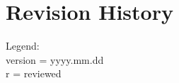
\begingroup
\let\cleardoublepage\relax
\let\clearpage\relax

\chapter*{Revision History}



\endgroup

{\vspace{-.5cm}
\footnotesize Legend: \\
version = yyyy.mm.dd \\
r = reviewed}
